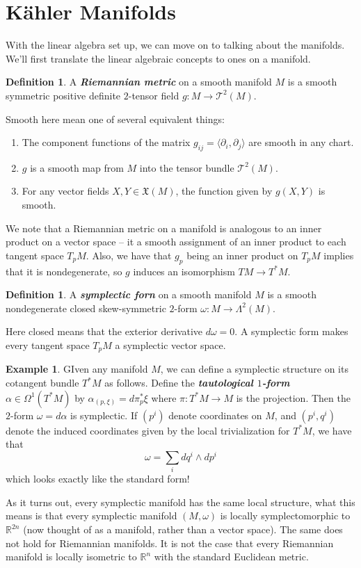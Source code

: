 \documentclass[psamsfonts]{amsart}
\theoremstyle{definition}
\newtheorem{defn}[thm]{Definition}
\newtheorem{exmp}[thm]{Example}
\theoremstyle{remark}
\newcommand{\R}{\mathbb{R}}
\newcommand{\ib}[1]{\textbf{\textit{#1}}}
\begin{document}
\section*{K\"ahler Manifolds}
%
With the linear algebra set up, we can move on to talking about the manifolds. We'll first translate the linear algebraic concepts to ones on a manifold.
%
\begin{defn}
A \ib{Riemannian metric} on a smooth manifold $M$ is a smooth symmetric positive definite $2$-tensor field $g: M \to \mathcal{T}^2(M)$.
\end{defn}
Smooth here mean one of several equivalent things:
\begin{enumerate}
\item The component functions of the matrix $g_{ij} = \langle \partial_i, \partial_j \rangle$ are smooth in any chart.
\item $g$ is a smooth map from $M$ into the tensor bundle $\mathcal{T}^2(M)$.
\item For any vector fields $X,Y \in \mathfrak{X}(M)$, the function given by $g(X,Y)$ is smooth.
\end{enumerate}
We note that a Riemannian metric on a manifold is analogous to an inner product on a vector space -- it a smooth assignment of an inner product to each tangent space $T_pM$. Also, we have that $g_p$ being an inner product on $T_pM$ implies that it is nondegenerate, so $g$ induces an isomorphism $TM \to T^*M$.
\begin{defn}
A \ib{symplectic forn} on a smooth manifold $M$ is a smooth nondegenerate closed skew-symmetric $2$-form $\omega: M \to \Lambda^2(M)$.
\end{defn}
Here closed means that the exterior derivative $d\omega = 0$. A symplectic form makes every tangent space $T_pM$ a symplectic vector space.
%
\begin{exmp}
GIven any manifold $M$, we can define a symplectic structure on its cotangent bundle $T^*M$ as follows. Define the \ib{tautological $1$-form} $\alpha \in \Omega^1(T^*M)$ by $\alpha_(p, \xi) = d\pi_p^*\xi$ where $\pi: T^*M \to M$ is the projection. Then the $2$-form $\omega = d\alpha$ is symplectic. If $(p^i)$ denote coordinates on $M$, and $(p^i,q^i)$ denote the induced coordinates given by the local trivialization for $T^*M$, we have that 
$$\omega = \sum_i dq^i \wedge dp^i $$
which looks exactly like the standard form!
\end{exmp}
%
As it turns out, every symplectic manifold has the same local structure, what this means is that every symplectic manifold $(M,\omega)$ is locally symplectomorphic to $\R^{2n}$ (now thought of as a manifold, rather than a vector space). The same does not hold for Riemannian manifolds. It is not the case that every Riemannian manifold is locally isometric to $\R^n$ with the standard Euclidean metric. 
\end{document}
